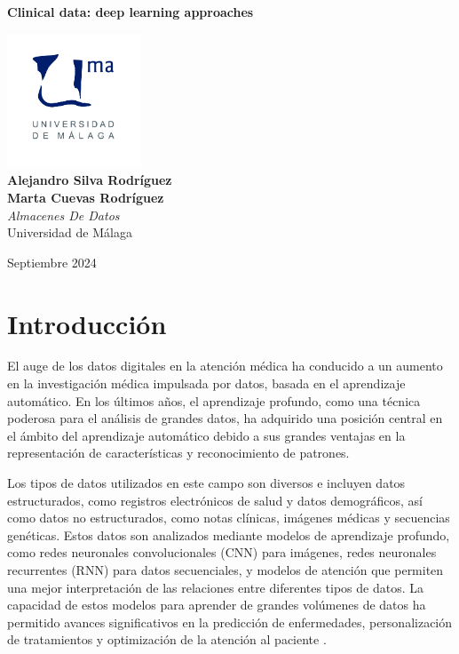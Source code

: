 \documentclass{article}
\begin{document}
\begin{titlepage}
	\centering
	\vspace*{3cm}
	
	{\Huge \textbf{Clinical data: deep learning approaches}\\[0.5cm]}
	
	\vspace{2cm}
	\includegraphics[width=0.3\textwidth]{images/uma_logo.jpg}\\[1cm]
	
	{\LARGE \textbf{Alejandro Silva Rodríguez}\\[0.5cm]}
	{\LARGE \textbf{Marta Cuevas Rodríguez}\\[0.5cm]}
	{\large \textit{Almacenes De Datos}\\
		Universidad de Málaga\\
		}
	
	\vfill
	
	{\large Septiembre 2024}
\end{titlepage}

\tableofcontents

\newpage
\section{Introducción}
\label{sec:introduccion}

El auge de los datos digitales en la atención médica ha conducido a un aumento en la investigación médica impulsada por datos, basada en el aprendizaje automático. En los últimos años, el aprendizaje profundo, como una técnica poderosa para el análisis de grandes datos, ha adquirido una posición central en el ámbito del aprendizaje automático debido a sus grandes ventajas en la representación de características y reconocimiento de patrones.

Los tipos de datos utilizados en este campo son diversos e incluyen datos estructurados, como registros electrónicos de salud y datos demográficos, así como datos no estructurados, como notas clínicas, imágenes médicas y secuencias genéticas. Estos datos son analizados mediante modelos de aprendizaje profundo, como redes neuronales convolucionales (CNN) para imágenes, redes neuronales recurrentes (RNN) para datos secuenciales, y modelos de atención que permiten una mejor interpretación de las relaciones entre diferentes tipos de datos. La capacidad de estos modelos para aprender de grandes volúmenes de datos ha permitido avances significativos en la predicción de enfermedades, personalización de tratamientos y optimización de la atención al paciente\cite{8787233} .
\end{document}
